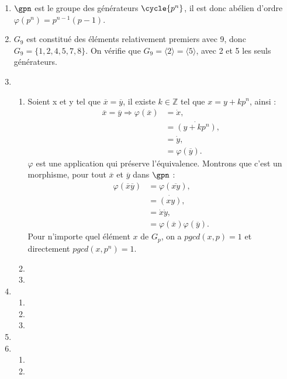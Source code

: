 
\begin{enumerate}
    \item $\gpn$ est le groupe des générateurs $\cycle{p^n}$, il est donc abélien d'ordre $\varphi(p^n) = p^{n-1}(p-1)$.
    \item $G_9$ est constitué des éléments relativement premiers avec 9, donc $ G_9 = \{1,2,4,5,7,8\}$. On vérifie que $G_9 = \langle 2 \rangle = \langle 5 \rangle$, avec 2 et 5 les seuls générateurs.
       \item \begin{enumerate}[label=\alph*)]
            \item  Soient x et y tel que $\overline{x} = \overline{y}$,  il existe $k\in \mathbb{Z}$ tel que $x=y+kp^n$, ainsi :
    \begin{align*}
        \overline{x}=\overline{y} \Rightarrow \varphi(\overline{x}) &= \Dot{x}, \\
        &= \Dot{(y + kp^n)}, \\
        &= \Dot{y}, \\
        &= \varphi(\overline{y}).
    \end{align*}
    $\varphi$ est une application qui préserve l'équivalence. Montrons que c'est un morphisme, pour tout $\overline{x}$ et $\overline{y}$ dans $\gpn$ : 
    \begin{align*}
        \varphi(\overline{x}\overline{y}) &= \varphi(\overline{xy}), \\
        &= \Dot{(xy)}, \\
        &= \Dot{x}\Dot{y}, \\
        &= \varphi(\overline{x})\varphi(\overline{y}).
    \end{align*}
Pour n'importe quel élément $x$ de $G_p$, on a $pgcd(x,p)=1$ et directement $pgcd(x,p^n)=1$.
        \item 
        \item 
    \end{enumerate} 
    \item     \begin{enumerate}[label=\alph*)]
        \item 
        \item 
        \item
    \end{enumerate}
    \item
    \item 
    \begin{enumerate}[label=\alph*)]
        \item 
        \item
    \end{enumerate}
\end{enumerate}
